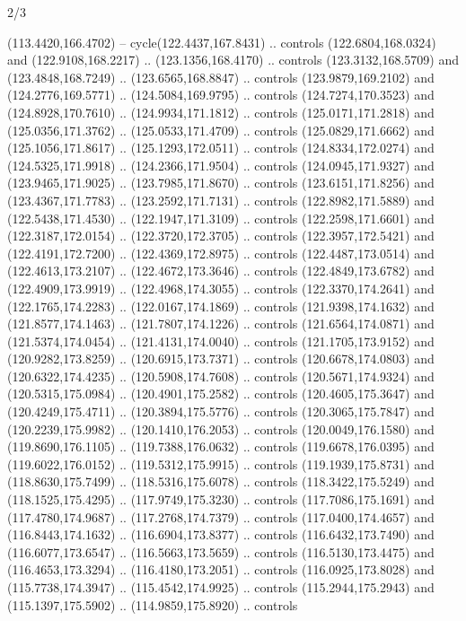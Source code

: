\begin{flagdescription}{2/3}
\begin{scope}[shift={(0.5\flaglength,0.5)},scale=\flagwidth/320]
\begin{scope}[y=0.8pt, x=0.8pt, yscale=-1,shift={(-118.3,-146)}]
  (113.4420,166.4702) -- cycle(122.4437,167.8431) .. controls
  (122.6804,168.0324) and (122.9108,168.2217) .. (123.1356,168.4170) .. controls
  (123.3132,168.5709) and (123.4848,168.7249) .. (123.6565,168.8847) .. controls
  (123.9879,169.2102) and (124.2776,169.5771) .. (124.5084,169.9795) .. controls
  (124.7274,170.3523) and (124.8928,170.7610) .. (124.9934,171.1812) .. controls
  (125.0171,171.2818) and (125.0356,171.3762) .. (125.0533,171.4709) .. controls
  (125.0829,171.6662) and (125.1056,171.8617) .. (125.1293,172.0511) .. controls
  (124.8334,172.0274) and (124.5325,171.9918) .. (124.2366,171.9504) .. controls
  (124.0945,171.9327) and (123.9465,171.9025) .. (123.7985,171.8670) .. controls
  (123.6151,171.8256) and (123.4367,171.7783) .. (123.2592,171.7131) .. controls
  (122.8982,171.5889) and (122.5438,171.4530) .. (122.1947,171.3109) .. controls
  (122.2598,171.6601) and (122.3187,172.0154) .. (122.3720,172.3705) .. controls
  (122.3957,172.5421) and (122.4191,172.7200) .. (122.4369,172.8975) .. controls
  (122.4487,173.0514) and (122.4613,173.2107) .. (122.4672,173.3646) .. controls
  (122.4849,173.6782) and (122.4909,173.9919) .. (122.4968,174.3055) .. controls
  (122.3370,174.2641) and (122.1765,174.2283) .. (122.0167,174.1869) .. controls
  (121.9398,174.1632) and (121.8577,174.1463) .. (121.7807,174.1226) .. controls
  (121.6564,174.0871) and (121.5374,174.0454) .. (121.4131,174.0040) .. controls
  (121.1705,173.9152) and (120.9282,173.8259) .. (120.6915,173.7371) .. controls
  (120.6678,174.0803) and (120.6322,174.4235) .. (120.5908,174.7608) .. controls
  (120.5671,174.9324) and (120.5315,175.0984) .. (120.4901,175.2582) .. controls
  (120.4605,175.3647) and (120.4249,175.4711) .. (120.3894,175.5776) .. controls
  (120.3065,175.7847) and (120.2239,175.9982) .. (120.1410,176.2053) .. controls
  (120.0049,176.1580) and (119.8690,176.1105) .. (119.7388,176.0632) .. controls
  (119.6678,176.0395) and (119.6022,176.0152) .. (119.5312,175.9915) .. controls
  (119.1939,175.8731) and (118.8630,175.7499) .. (118.5316,175.6078) .. controls
  (118.3422,175.5249) and (118.1525,175.4295) .. (117.9749,175.3230) .. controls
  (117.7086,175.1691) and (117.4780,174.9687) .. (117.2768,174.7379) .. controls
  (117.0400,174.4657) and (116.8443,174.1632) .. (116.6904,173.8377) .. controls
  (116.6432,173.7490) and (116.6077,173.6547) .. (116.5663,173.5659) .. controls
  (116.5130,173.4475) and (116.4653,173.3294) .. (116.4180,173.2051) .. controls
  (116.0925,173.8028) and (115.7738,174.3947) .. (115.4542,174.9925) .. controls
  (115.2944,175.2943) and (115.1397,175.5902) .. (114.9859,175.8920) .. controls

\end{scope}
\end{scope}
\end{flagdescription}
